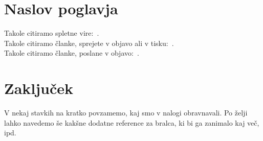 \documentclass[12pt,a4paper,titlepage,openany]{report}
\begin{document}
\chapter{Naslov poglavja}
\thispagestyle{fancy}

Takole citiramo spletne vire:~\cite{splet1,splet2,splet3}.\\
Takole citiramo članke, sprejete v objavo ali v tisku:~\cite{Novak,Novak2,Novak3,Novak4}.\\
Takole citiramo članke, poslane v objavo:~\cite{Novak5,Novak6}.

\chapter{Zaključek}
\thispagestyle{fancy}

V nekaj stavkih na kratko povzamemo, kaj smo v nalogi obravnavali.
Po želji lahko navedemo še kakšne dodatne reference za bralca, ki bi ga zanimalo kaj več, ipd.


\end{document}
